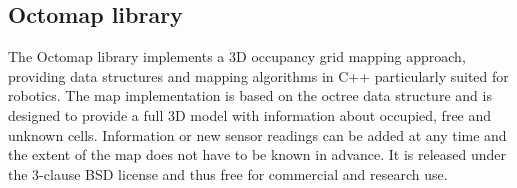 \subsection{Octomap library}
\label{subsec:octomap} 
The Octomap library implements a 3D occupancy grid mapping approach, providing data structures and mapping algorithms in C++ particularly suited for robotics.  The map implementation is based on the octree data structure and is designed to provide a full 3D model with information about occupied, free and unknown cells. Information or new sensor readings can be added at any time and the extent of the map does not have to be known in advance. It is released under the  3-clause BSD license and thus free for commercial and research use.


